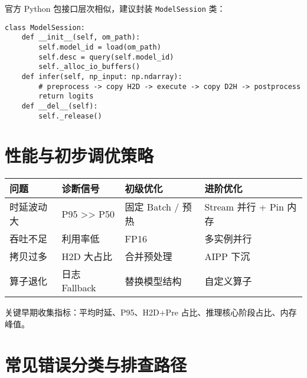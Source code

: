 官方 Python 包接口层次相似，建议封装
\passthrough{\lstinline!ModelSession!} 类：

\begin{lstlisting}
class ModelSession:
    def __init__(self, om_path):
        self.model_id = load(om_path)
        self.desc = query(self.model_id)
        self._alloc_io_buffers()
    def infer(self, np_input: np.ndarray):
        # preprocess -> copy H2D -> execute -> copy D2H -> postprocess
        return logits
    def __del__(self):
        self._release()
\end{lstlisting}

\section{性能与初步调优策略}\label{ux6027ux80fdux4e0eux521dux6b65ux8c03ux4f18ux7b56ux7565}

\begin{longtable}[]{@{}llll@{}}
\toprule\noalign{}
问题 & 诊断信号 & 初级优化 & 进阶优化 \\
\midrule\noalign{}
\endhead
\bottomrule\noalign{}
\endlastfoot
时延波动大 & P95 \textgreater\textgreater{} P50 & 固定 Batch / 预热 &
Stream 并行 + Pin 内存 \\
吞吐不足 & 利用率低 & FP16 & 多实例并行 \\
拷贝过多 & H2D 大占比 & 合并预处理 & AIPP 下沉 \\
算子退化 & 日志 Fallback & 替换模型结构 & 自定义算子 \\
\end{longtable}

关键早期收集指标：平均时延、P95、H2D+Pre
占比、推理核心阶段占比、内存峰值。

\section{常见错误分类与排查路径}\label{ux5e38ux89c1ux9519ux8befux5206ux7c7bux4e0eux6392ux67e5ux8defux5f84}


